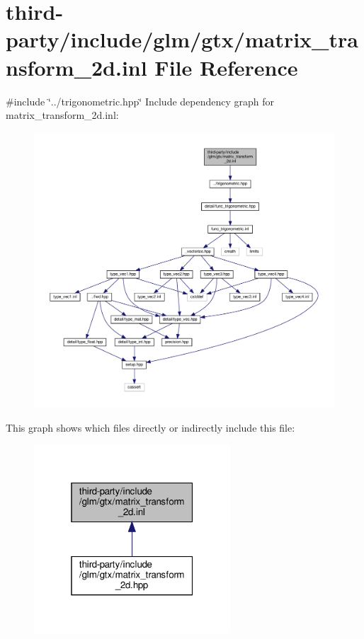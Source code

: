 \hypertarget{matrix__transform__2d_8inl}{}\section{third-\/party/include/glm/gtx/matrix\+\_\+transform\+\_\+2d.inl File Reference}
\label{matrix__transform__2d_8inl}
{\ttfamily \#include \char`\"{}../trigonometric.\+hpp\char`\"{}}\newline
Include dependency graph for matrix\+\_\+transform\+\_\+2d.\+inl\+:
\nopagebreak
\begin{figure}[H]
\begin{center}
\leavevmode
\includegraphics[width=350pt]{matrix__transform__2d_8inl__incl}
\end{center}
\end{figure}
This graph shows which files directly or indirectly include this file\+:
\nopagebreak
\begin{figure}[H]
\begin{center}
\leavevmode
\includegraphics[width=208pt]{matrix__transform__2d_8inl__dep__incl}
\end{center}
\end{figure}

